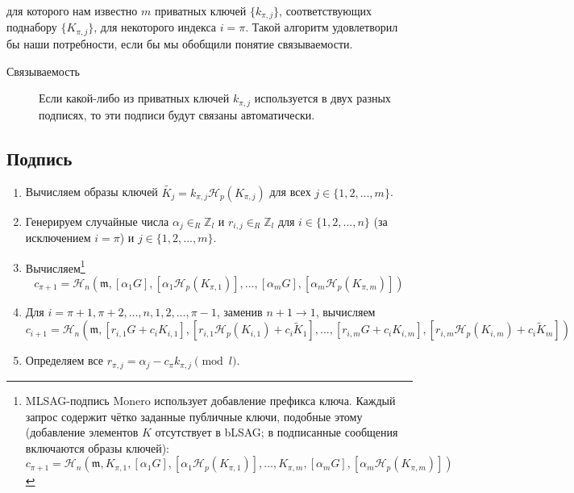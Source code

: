 для которого нам известно $m$ приватных ключей \(\{k_{\pi, j}\}\), соответствующих поднабору \(\{K_{\pi, j}\}\), для некоторого индекса \(i = \pi\). Такой алгоритм удовлетворил бы наши потребности, если бы мы обобщили понятие связываемости.
\begin{description}
	\item[Связываемость] Если какой-либо из приватных ключей \(k_{\pi, j}\) используется в двух разных подписях, то эти подписи будут связаны автоматически.
\end{description}


\subsection*{Подпись}

\begin{enumerate}
	\item Вычисляем образы ключей \(\tilde{K_j} = k_{\pi, j} \mathcal{H}_p(K_{\pi, j})\) для всех \(j \in \{1, 2, ..., m\}\).

	\item Генерируем случайные числа \(\alpha_j \in_R \mathbb{Z}_l\) и \(r_{i, j} \in_R \mathbb{Z}_l\) для \(i \in \{1, 2, ..., n\}\) (за исключением \(i = \pi\)) и \(j \in \{1, 2, ..., m\}\).

	\item Вычисляем\footnote{MLSAG-подпись Monero использует добавление префикса ключа. Каждый запрос содержит чётко заданные публичные ключи, подобные этому (добавление элементов $K$ отсутствует в bLSAG; в подписанные сообщения включаются образы ключей):\vspace{-.25cm}
	\[c_{\pi+1} = \mathcal{H}_n(\mathfrak{m}, K_{\pi, 1}, [\alpha_1 G], [\alpha_1 \mathcal{H}_p(K_{\pi, 1})], ..., K_{\pi, m}, [\alpha_m G], [\alpha_m \mathcal{H}_p(K_{\pi, m})])
	\]}
	\[c_{\pi+1} = \mathcal{H}_n(\mathfrak{m}, [\alpha_1 G], [\alpha_1 \mathcal{H}_p(K_{\pi, 1})], ..., [\alpha_m G], [\alpha_m \mathcal{H}_p(K_{\pi, m})])\]

	\item Для \(i = \pi+1, \pi+2, ..., n, 1, 2, ..., \pi-1\), заменив \(n + 1 \rightarrow 1\), вычисляем\vspace{.175cm}
	\[ c_{i+1} = \mathcal{H}_n(\mathfrak{m}, [r_{i, 1} G + c_i K_{i, 1}], [r_{i, 1} \mathcal{H}_p(K_{i, 1}) + c_i \tilde{K}_1], 
	..., [r_{i, m} G + c_i K_{i, m}], [r_{i, m} \mathcal{H}_p(K_{i, m}) + c_i \tilde{K}_m])\]

	\item Определяем все \(r_{\pi, j} = \alpha_j - c_\pi k_{\pi, j} \pmod l\).
\end{enumerate}

